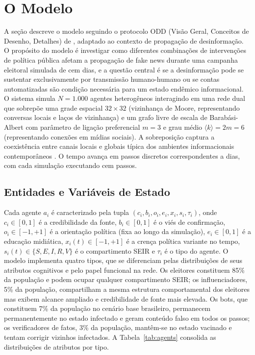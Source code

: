 \documentclass[12pt,a4paper]{article}
\theoremstyle{definition}
\theoremstyle{plain}
\begin{document}
\section{O Modelo}
\label{sec:model}

A seção descreve o modelo seguindo o protocolo ODD (Visão Geral, Conceitos de Desenho, Detalhes) de \citet{grimm2010odd}, adaptado ao contexto de propagação de desinformação. O propósito do modelo é investigar como diferentes combinações de intervenções de política pública afetam a propagação de fake news durante uma campanha eleitoral simulada de cem dias, e a questão central é se a desinformação pode se sustentar exclusivamente por transmissão humano-humano ou se contas automatizadas são condição necessária para um estado endêmico informacional. O sistema simula $N = 1{.}000$ agentes heterogêneos interagindo em uma rede dual que sobrepõe uma grade espacial $32 \times 32$ (vizinhança de Moore, representando conversas locais e laços de vizinhança) e um grafo livre de escala de Barabási-Albert com parâmetro de ligação preferencial $m = 3$ e grau médio $\langle k \rangle = 2m = 6$ (representando conexões em mídias sociais). A sobreposição captura a coexistência entre canais locais e globais típica dos ambientes informacionais contemporâneos \citep{cinelli2021echo}. O tempo avança em passos discretos correspondentes a dias, com cada simulação executando cem passos.

\subsection{Entidades e Variáveis de Estado}
\label{subsec:entities}

Cada agente $a_i$ é caracterizado pela tupla $(c_i, b_i, o_i, e_i, x_i, s_i, \tau_i)$, onde $c_i \in [0,1]$ é a credibilidade da fonte, $b_i \in [0,1]$ é o viés de confirmação, $o_i \in [-1,+1]$ é a orientação política (fixa ao longo da simulação), $e_i \in [0,1]$ é a educação midiática, $x_i(t) \in [-1,+1]$ é a crença política variante no tempo, $s_i(t) \in \{S, E, I, R, V\}$ é o compartimento SEIR e $\tau_i$ é o tipo do agente. O modelo implementa quatro tipos, que se diferenciam pelas distribuições de seus atributos cognitivos e pelo papel funcional na rede. Os eleitores constituem 85\% da população e podem ocupar qualquer compartimento SEIR; os influenciadores, 5\% da população, compartilham a mesma estrutura comportamental dos eleitores mas exibem alcance ampliado e credibilidade de fonte mais elevada. Os bots, que constituem 7\% da população no cenário base brasileiro, permanecem permanentemente no estado infectado e geram conteúdo falso em todos os passos; os verificadores de fatos, 3\% da população, mantêm-se no estado vacinado e tentam corrigir vizinhos infectados. A Tabela~\ref{tab:agents} consolida as distribuições de atributos por tipo.
\end{document}
